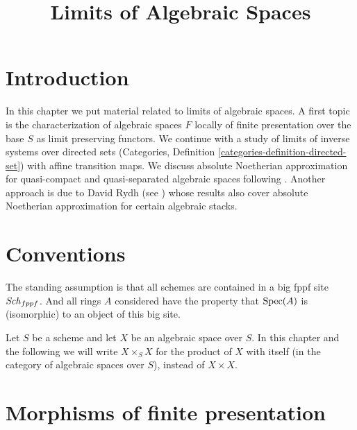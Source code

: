 

%


\title{Limits of Algebraic Spaces}


\maketitle

\label{section-phantom}

\tableofcontents

\section{Introduction}
\label{section-introduction}

\noindent
In this chapter we put material related to limits of algebraic spaces.
A first topic is the characterization of algebraic spaces $F$ locally
of finite presentation over the base $S$ as limit preserving functors.
We continue with a study of limits of inverse systems over
directed sets (Categories, Definition \ref{categories-definition-directed-set})
with affine transition maps. We discuss absolute
Noetherian approximation for quasi-compact and quasi-separated algebraic
spaces following \cite{CLO}. Another approach is due to David Rydh (see
\cite{rydh_approx}) whose results also cover absolute Noetherian
approximation for certain algebraic stacks.


\section{Conventions}
\label{section-conventions}

\noindent
The standing assumption is that all schemes are contained in
a big fppf site $\mathit{Sch}_{fppf}$. And all rings $A$ considered
have the property that $\mathop{\mathrm{Spec}}(A)$ is (isomorphic) to an
object of this big site.

\medskip\noindent
Let $S$ be a scheme and let $X$ be an algebraic space over $S$.
In this chapter and the following we will write $X \times_S X$
for the product of $X$ with itself (in the category of algebraic
spaces over $S$), instead of $X \times X$.











\section{Morphisms of finite presentation}
\label{section-finite-presentation}


